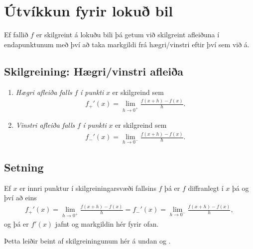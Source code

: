 \documentclass[a4paper,10pt,icelandic]{sphinxmanual}
\begin{document}
\section{Útvíkkun fyrir lokuð bil}
\label{kafli03:utvikkun-fyrir-loku-bil}
Ef fallið \(f\) er skilgreint á lokuðu bili þá getum við skilgreint
afleiðuna í endapunktunum með því að taka markgildi frá hægri/vinstri
eftir því sem við á.


\subsection{Skilgreining: Hægri/vinstri afleiða}
\label{kafli03:index-2}\label{kafli03:skilgreining-haegri-vinstri-afleia}\begin{enumerate}
\item {} 
\emph{Hægri afleiða falls} \(f\) \emph{í punkti} \(x\) er skilgreind
sem
\begin{equation*}
\begin{split}f_+'(x)=\lim_{h\rightarrow 0^+}\frac{f(x+h)-f(x)}{h}.\end{split}
\end{equation*}
\item {} 
\emph{Vinstri afleiða falls} \(f\) \emph{í punkti} \(x\) er
skilgreind sem
\begin{equation*}
\begin{split}f_-'(x)=\lim_{h\rightarrow 0^-}\frac{f(x+h)-f(x)}{h}.\end{split}
\end{equation*}
\end{enumerate}


\subsection{Setning}
\label{kafli03:id2}
Ef \(x\) er innri punktur í skilgreiningarsvæði fallsins \(f\)
þá er \(f\) diffranlegt í \(x\) þá og því að eins
\begin{equation*}
\begin{split}f_+'(x)=\lim_{h\rightarrow 0^+}\frac{f(x+h)-f(x)}{h}
=   f_-'(x)=\lim_{h\rightarrow 0^-}\frac{f(x+h)-f(x)}{h},\end{split}
\end{equation*}
og þá er \(f'(x)\) jafnt og markgildin hér fyrir ofan.

Þetta leiðir beint af skilgreiningunum hér á undan og
{\hyperref[kafli02:setning\string-hv\string-markgildi]{}}.
\end{document}
